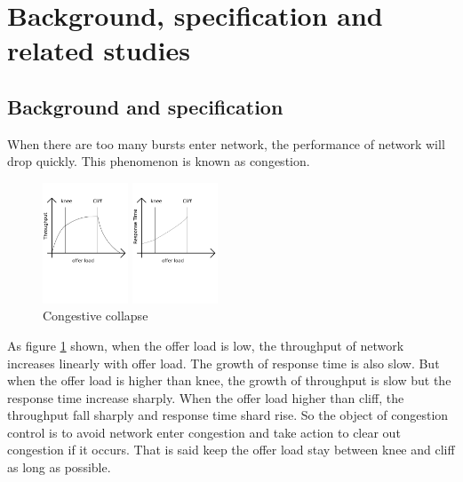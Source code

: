\section{Background, specification and related studies}

\subsection{Background and specification}

When there are too many bursts enter network, the performance of network will drop quickly. This phenomenon is known as congestion. 

\begin{figure}[!htb]
  \begin{minipage}[t]{0.5\linewidth} 
    \centering 
    \includegraphics[width=1in]{fig/congestion_throughput} 
  \end{minipage}%
  \begin{minipage}[t]{0.5\linewidth} 
    \centering  
    \includegraphics[width=1in]{fig/congestion_ete} 
  \end{minipage} 
  \caption{Congestive collapse}
  \label{fig:problem}
\end{figure}

As figure \ref{fig:problem} shown, when the offer load is low, the throughput of network increases linearly with offer load. The growth of response time is also slow. But when the offer load is higher than knee, the growth of throughput is slow but the response time increase sharply. When the offer load higher than cliff, the throughput fall sharply and response time shard rise. So the object of congestion control is to avoid network enter congestion and take action to clear out
congestion if it occurs. That is said keep the offer load stay between knee and cliff as long as possible.

